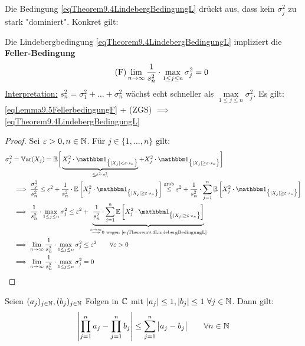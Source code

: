 \begin{bemerkung}
	 Die Bedingung \eqref{eqTheorem9.4LindebergBedingungL} drückt aus, dass kein $\sigma_j^2$ zu stark "dominiert".
	 Konkret gilt:
\end{bemerkung}

\begin{lemma}\label{lemma9.5}
	Die Lindebergbedingung \eqref{eqTheorem9.4LindebergBedingungL} impliziert die \textbf{Feller-Bedingung}
	\begin{align}\label{eqLemma9.5FellerbedingungF}\tag{F}
		\lim\limits_{n\to\infty}\frac{1}{s_n^2}\cdot\max\limits_{1\leq j\leq n}\sigma_j^2=0
	\end{align}
	\underline{Interpretation:}
	$s_n^2=\sigma_1^2+\ldots+\sigma_n^2$ wächst echt schneller als $\max\limits_{1\leq j\leq n}\sigma_j^2$.\nl
	Es gilt: \eqref{eqLemma9.5FellerbedingungF} + (ZGS) $\implies$ \eqref{eqTheorem9.4LindebergBedingungL}
\end{lemma}

\begin{proof}
	Sei $\varepsilon>0,n\in\mathbb{N}$. Für $j\in\lbrace 1,\ldots,n\rbrace$ gilt:
	\begin{align*}
		\sigma_j^2
		&=\Var(X_j)
		=\E\bigg[\underbrace{X_j^2\cdot\indi_{\big\lbrace|X_j|<\varepsilon\cdot s_n\big\rbrace}}_{\leq\varepsilon^2\cdot s_n^2}+X_j^2\cdot\indi_{\big\lbrace|X_j|\geq\varepsilon\cdot s_n\big\rbrace}\bigg]\\
		&\implies 
		\frac{\sigma_j^2}{s_n^2}
		\leq\varepsilon^2+\frac{1}{s_n^2}\cdot\E\left[X_j^2\cdot\indi_{\big\lbrace|X_j|\geq\varepsilon\cdot s_n\big\rbrace}\right]
		\overset{\text{grob}}\leq
		\varepsilon^2+\frac{1}{s_n^2}\cdot\sum\limits_{j=1}^n\E\left[X_j^2\cdot\indi_{\big\lbrace |X_j|\geq\varepsilon\cdot s_n\big\rbrace}\right]\\
		&\implies
		\frac{1}{s_n^2}\cdot\max\limits_{1\leq j\leq n}\sigma_j^2
		\leq\varepsilon^2+\underbrace{\frac{1}{s_n^2}\cdot\sum\limits_{j=1}^n\E\left[X_j^2\cdot\indi_{\big\lbrace|X_j|\geq\varepsilon\cdot s_n\big\rbrace}\right]}_{\overset{n\to\infty}{\longrightarrow}0\text{ wegen \eqref{eqTheorem9.4LindebergBedingungL}}}\\
		&\implies
		\limn\frac{1}{s_n^2}\cdot\max\limits_{1\leq j\leq n}\sigma_j^2
		\leq\varepsilon^2\qquad\forall\varepsilon>0\\
		&\implies\limn\frac{1}{s_n^2}\cdot\max\limits_{1\leq j\leq n}\sigma_j^2=0
	\end{align*}
\end{proof}

\setcounter{satz}{6} %
\begin{lemma}\label{lemma9.7}
	Seien $(a_j)_{j\in\mathbb{N}},(b_j)_{j\in\mathbb{N}}$ Folgen in $\mathbb{C}$ mit $|a_j|\leq 1,|b_j|\leq 1~\forall j\in\mathbb{N}$.
	Dann gilt:
	\begin{align*}
		\left|\prod\limits_{j=1}^n a_j-\prod\limits_{j=1}^n b_j\right|
		\leq\sum\limits_{j=1}^n\big| a_j-b_j\big|\qquad\forall n\in\mathbb{N}
	\end{align*}
\end{lemma}

